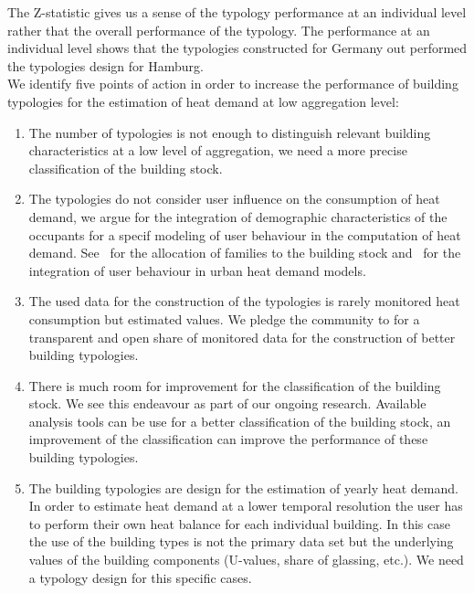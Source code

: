 \documentclass[authoryear,preprint,review,12pt]{elsarticle}
\begin{document}
\begin{linenumbers}
The Z-statistic gives us a sense of the typology performance at an individual
level rather that the overall performance of the typology. The performance at
an individual level shows that the typologies constructed for Germany out
performed the typologies design for Hamburg.\\

We identify five points of action in order to increase the performance of
building typologies for the estimation of heat demand at low aggregation level:

\begin{enumerate}
    \item The number of typologies is not enough to distinguish relevant
        building characteristics at a low level of aggregation, we need a more
        precise classification of the building stock.
    \item The typologies do not consider user influence on the consumption of
        heat demand, we argue for the integration of demographic
        characteristics of the occupants for a specif modeling of user
        behaviour in the computation of heat demand.
        See~\cite{Munoz.2014b} for the allocation of families to
        the building stock and~\cite{Munoz.2014c} for the integration of
        user behaviour in urban heat demand models.
    \item The used data for the construction of the typologies is rarely
        monitored heat consumption but estimated values. We pledge the
        community to for a transparent and open share of monitored data for the
        construction of better building typologies.
    \item There is much room for improvement for the classification of the
        building stock. We see this endeavour as part of our ongoing research.
        Available analysis tools can be use for a better classification of the
        building stock, an improvement of the classification can improve the
        performance of these building typologies.
    \item The building typologies are design for the estimation of yearly heat
        demand. In order to estimate heat demand at a lower temporal resolution
        the user has to perform their own heat balance for each individual
        building. In this case the use of the building types is not the
        primary data set but the underlying values of the building components
        (U-values, share of glassing, etc.). We need a typology design for this
        specific cases.
\end{enumerate}


\end{linenumbers}
\end{document}
